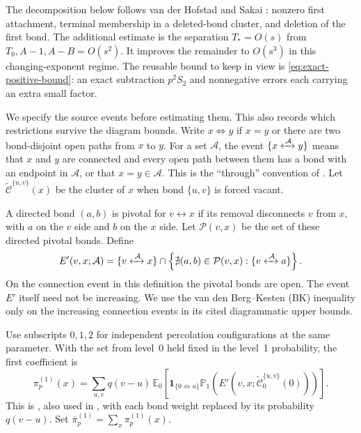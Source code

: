 \documentclass[11pt]{article}
\theoremstyle{definition}
\newcommand{\ind}{\mathbf 1}
\newcommand{\through}[3]{\{#1\xleftrightarrow{\,#3\,}#2\}}
\begin{document}
The decomposition below follows van der Hofstad and Sakai
\cite[Section~3.2, (3.45)--(3.55)]{HS2005}: nonzero first attachment,
terminal membership in a deleted-bond cluster, and deletion of the first bond.
The additional estimate is the separation $T_*=O(s)$ from
$T_0,A-1,A-B=O(s^2)$. It improves the remainder to $O(s^3)$ in
this changing-exponent regime. The reusable bound to keep in view is
\eqref{eq:exact-positive-bound}: an exact subtraction $p^2S_2$ and
nonnegative errors each carrying an extra small factor.

We specify the source events before estimating them. This also records
which restrictions survive the diagram bounds. Write $x\Leftrightarrow y$
if $x=y$ or there are two bond-disjoint open paths from $x$ to $y$.
For a set $\mathcal A$, the event
$\through{x}{y}{\mathcal A}$ means that $x$ and $y$ are connected and
every open path between them has a bond with an endpoint in $\mathcal A$,
or that $x=y\in\mathcal A$. This is the ``through'' convention of
\cite[Definition~3.1]{BCHSS2005}. Let $\widetilde{\mathcal C}^{\{u,v\}}(x)$
be the cluster of $x$ when bond $\{u,v\}$ is forced vacant.

A directed bond $(a,b)$ is pivotal for $v\leftrightarrow x$ if its
removal disconnects $v$ from $x$, with $a$ on the $v$ side and $b$ on
the $x$ side. Let $\mathcal P(v,x)$ be the set of these directed
pivotal bonds. Define
\begin{equation}\label{eq:Eprime}
 E'(v,x;\mathcal A)=\through{v}{x}{\mathcal A}
 \cap\left\{\nexists(a,b)\in\mathcal P(v,x):
                    \through{v}{a}{\mathcal A}\right\}.
\end{equation}
On the connection event in this definition the pivotal bonds are open.
The event $E'$ itself need not be increasing. We use the van den Berg--Kesten
(BK) inequality only on the
increasing connection events in its cited diagrammatic upper bounds.

Use subscripts $0,1,2$ for independent percolation configurations at the
same parameter. With the set from level~0 held fixed in the level~1
probability, the first coefficient is
\begin{equation}\label{eq:pi1-definition}
 \pi_p^{(1)}(x)=\sum_{u,v}q(v-u)\,
 \mathbb E_0\left[\ind_{\{0\Leftrightarrow u\}}
  \mathbb P_1\left(E'(v,x;
    \widetilde{\mathcal C}_0^{\{u,v\}}(0))\right)\right].
\end{equation}
This is \cite[(3.31)]{BCHSS2005}, also used in
\cite[Section~3.2, (3.44)--(3.45)]{HS2005}, with each bond weight
replaced by its probability $q(v-u)$. Set
$\overline\pi_p^{(1)}=\sum_x\pi_p^{(1)}(x)$.
\end{document}
